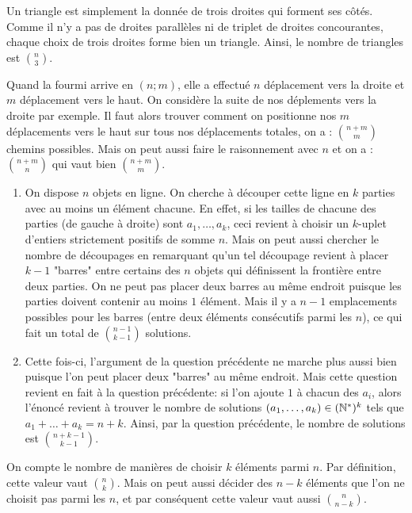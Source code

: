 \begin{sol}
Un triangle est simplement la donnée de trois droites qui forment ses côtés. Comme il n'y a pas de droites parallèles ni de triplet de droites concourantes, chaque choix de trois droites forme bien un triangle. Ainsi, le nombre de triangles est $\binom n3$.
\end{sol}

\begin{sol}
Quand la fourmi arrive en $(n;m)$, elle a effectué $n$ déplacement vers la droite et $m$ déplacement vers le haut. On considère la suite de nos déplements vers la droite par exemple. Il faut alors trouver comment on positionne nos $m$ déplacements vers le haut sur tous nos déplacements totales, on a : $\binom{n+m}{m}$ chemins possibles.
Mais on peut aussi faire le raisonnement avec $n$ et on a : $\binom{n+m}{n} $ qui vaut bien $\binom{n+m}{m}$.
\end{sol}

\begin{sol}
\begin{enumerate}
    \item On dispose $n$ objets en ligne. On cherche à découper cette ligne en $k$ parties avec au moins un élément chacune. En effet, si les tailles de chacune des parties (de gauche à droite) sont $a_1,\ldots,a_k$, ceci revient à choisir un $k$-uplet d'entiers strictement positifs de somme $n$. Mais on peut aussi chercher le nombre de découpages en remarquant qu'un tel découpage revient à placer $k-1$ "barres" entre certains des $n$ objets qui définissent la frontière entre deux parties. On ne peut pas placer deux barres au même endroit puisque les parties doivent contenir au moins $1$ élément. Mais il y a $n-1$ emplacements possibles pour les barres (entre deux éléments consécutifs parmi les $n$), ce qui fait un total de $\binom{n-1}{k-1}$ solutions.
    \item Cette fois-ci, l'argument de la question précédente ne marche plus aussi bien puisque l'on peut placer deux "barres" au même endroit. Mais cette question revient en fait à la question précédente: si l'on ajoute $1$ à chacun des $a_i$, alors l'énoncé revient à trouver le nombre de solutions $(a_1,\ldots,a_k)\in(\mathbb N^*)^k$ tels que $a_1+\ldots+a_k = n+k$. Ainsi, par la question précédente, le nombre de solutions est $\binom{n+k-1}{k-1}$.
\end{enumerate}
\end{sol}

\begin{sol}
On compte le nombre de manières de choisir $k$ éléments parmi $n$. Par définition, cette valeur vaut $\binom nk$. Mais on peut aussi décider des $n-k$ éléments que l'on ne choisit pas parmi les $n$, et par conséquent cette valeur vaut aussi $\binom n{n-k}$.
\end{sol}

